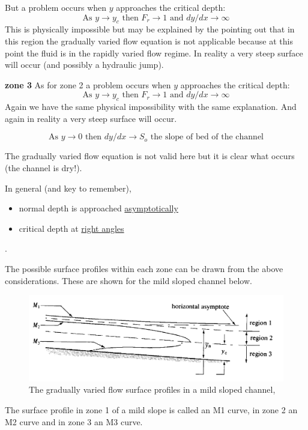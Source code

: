 \documentclass[a4paper, 12pt, british]{article} %
\numberwithin{equation}{section}
\numberwithin{figure}{section}
\numberwithin{table}{section}
\begin{document}
But a problem occurs when $y$ approaches the critical depth:
\begin{equation*}
\text{As } y \rightarrow y_c \text{ then } F_r \rightarrow 1 \text{ and } dy/dx \rightarrow \infty
\end{equation*}
This is physically impossible but may be explained by the pointing out that in this region the gradually varied flow equation is not applicable because at this point the fluid is in the rapidly varied flow regime.
In reality a very steep surface will occur (and possibly a hydraulic jump).

\textbf{zone 3}
As for zone 2 a problem occurs when $y$ approaches the critical depth:
\begin{equation*}
\text{As } y \rightarrow y_c \text{ then } F_r \rightarrow 1 \text{ and } dy/dx \rightarrow \infty
\end{equation*}
Again we have the same physical impossibility with the same explanation.
And again in reality a very steep surface will occur.

\begin{equation*}
\text{As } y \rightarrow 0 \text{ then } dy/dx \rightarrow S_o \text{ the slope of bed of the channel}
\end{equation*}

The gradually varied flow equation is not valid here but it is clear what occurs (the channel is dry!).

\newpage
In general (and key to remember), 
\begin{itemize}
	\item normal depth is approached \underline{asymptotically} 
	\item critical depth at \underline{right angles}
\end{itemize}.

The possible surface profiles within each zone can be drawn from the above considerations. These are shown for the mild sloped channel below.
\begin{figure}[H]
	\centering
	\includegraphics[scale=0.6,angle=1]{./images/fig_1152.png}
	\caption{The gradually varied flow surface profiles in a mild sloped channel, \cite{chadwick}}
	\label{fig:1152}
\end{figure}  
The surface profile in zone 1 of a mild slope is called an M1 curve, in zone 2 an M2 curve and in zone 3 an M3 curve.
\end{document}
